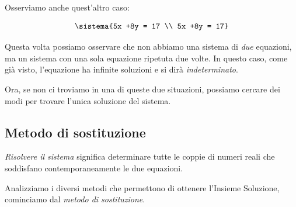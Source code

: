 \needspace{3\lineskip}
Osserviamo anche quest'altro caso:

\[\sistema{5x +8y = 17 \\ 5x +8y = 17}\]

Questa volta possiamo osservare che non abbiamo una sistema di \emph{due} 
equazioni, ma un sistema con una sola equazione ripetuta due volte. 
In questo caso, come già visto, l'equazione ha infinite soluzioni e si 
dirà \emph{indeterminato}.

Ora, se non ci troviamo in una di queste due situazioni, possiamo cercare 
dei modi per trovare l'unica soluzione del sistema.

\subsection{Metodo di sostituzione}
\emph{Risolvere il sistema} significa determinare tutte le coppie di
numeri reali che soddisfano contemporaneamente le due equazioni.

Analizziamo i diversi metodi che permettono di ottenere
l'Insieme Soluzione, cominciamo dal \emph{metodo di sostituzione}.


